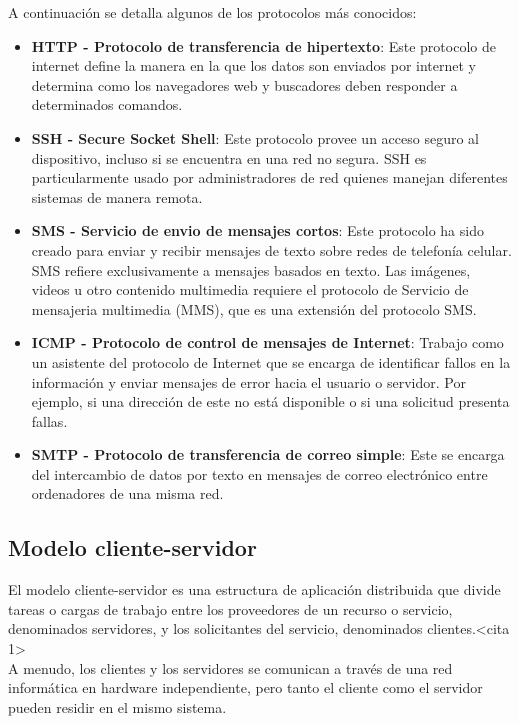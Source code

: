 A continuación se detalla algunos de los protocolos más conocidos:
\begin{itemize}
    \item \textbf{HTTP - Protocolo de transferencia de hipertexto}: Este protocolo de internet define la manera en la que los datos son enviados por internet y determina como los navegadores web y buscadores deben responder a determinados comandos.
    \item \textbf{SSH - Secure Socket Shell}: Este protocolo provee un acceso seguro al dispositivo, incluso si se encuentra en una red no segura. SSH es particularmente usado por administradores de red quienes manejan diferentes sistemas de manera remota.
    \item \textbf{SMS - Servicio de envio de mensajes cortos}: Este protocolo ha sido creado para enviar y recibir mensajes de texto sobre redes de telefonía celular. SMS refiere exclusivamente a mensajes basados en texto. Las imágenes, videos u otro contenido multimedia requiere el protocolo de Servicio de mensajeria multimedia (MMS), que es una extensión del protocolo SMS.
    \item \textbf{ICMP - Protocolo de control de mensajes de Internet}: Trabajo como un asistente del protocolo de Internet que se encarga de identificar fallos en la información y enviar mensajes de error hacia el usuario o servidor. Por ejemplo, si una dirección de este no está disponible o si una solicitud presenta fallas.
    \item \textbf{SMTP - Protocolo de transferencia de correo simple}: Este se encarga del intercambio de datos por texto en mensajes de correo electrónico entre ordenadores de una misma red.
\end{itemize}

\subsection{Modelo cliente-servidor}
El modelo cliente-servidor es una estructura de aplicación distribuida que divide tareas o cargas de trabajo entre los proveedores de un recurso o servicio, denominados servidores, y los solicitantes del servicio, denominados clientes.<cita 1> \\

A menudo, los clientes y los servidores se comunican a través de una red informática en hardware independiente, pero tanto el cliente como el servidor pueden residir en el mismo sistema.\\

